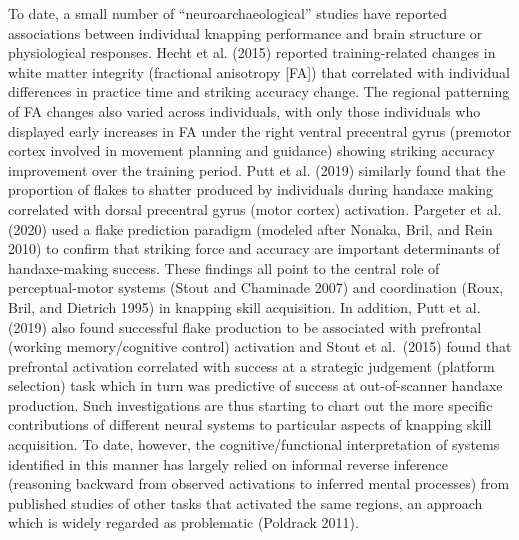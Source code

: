 \documentclass[smallextended]{svjour3}       %
\begin{document}
To date, a small number of ``neuroarchaeological'' studies have reported
associations between individual knapping performance and brain structure
or physiological responses. Hecht et al. (2015) reported
training-related changes in white matter integrity (fractional
anisotropy {[}FA{]}) that correlated with individual differences in
practice time and striking accuracy change. The regional patterning of
FA changes also varied across individuals, with only those individuals
who displayed early increases in FA under the right ventral precentral
gyrus (premotor cortex involved in movement planning and guidance)
showing striking accuracy improvement over the training period. Putt et
al. (2019) similarly found that the proportion of flakes to shatter
produced by individuals during handaxe making correlated with dorsal
precentral gyrus (motor cortex) activation. Pargeter et al. (2020) used
a flake prediction paradigm (modeled after Nonaka, Bril, and Rein 2010)
to confirm that striking force and accuracy are important determinants
of handaxe-making success. These findings all point to the central role
of perceptual-motor systems (Stout and Chaminade 2007) and coordination
(Roux, Bril, and Dietrich 1995) in knapping skill acquisition. In
addition, Putt et al. (2019) also found successful flake production to
be associated with prefrontal (working memory/cognitive control)
activation and Stout et al.~(2015) found that prefrontal activation
correlated with success at a strategic judgement (platform selection)
task which in turn was predictive of success at out-of-scanner handaxe
production. Such investigations are thus starting to chart out the more
specific contributions of different neural systems to particular aspects
of knapping skill acquisition. To date, however, the
cognitive/functional interpretation of systems identified in this manner
has largely relied on informal reverse inference (reasoning backward
from observed activations to inferred mental processes) from published
studies of other tasks that activated the same regions, an approach
which is widely regarded as problematic (Poldrack 2011).
\end{document}
